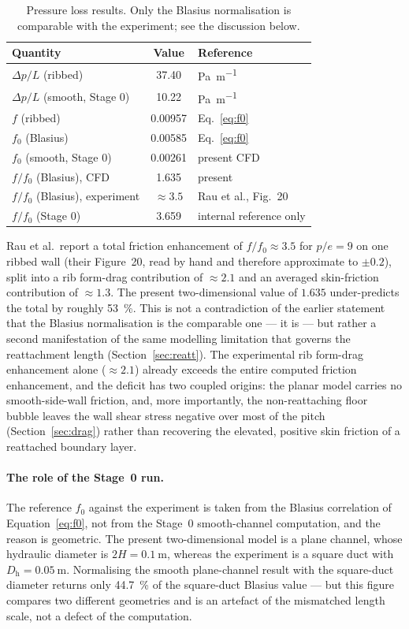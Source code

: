 \documentclass[11pt,a4paper]{article}
\newcommand{\Dh}{D_{\mathrm{h}}}
\begin{document}
\begin{table}[htbp]
\centering
\caption{Pressure loss results. Only the Blasius normalisation is
comparable with the experiment; see the discussion below.}
\label{tab:pressure}
\begin{tabular}{lSl}
\toprule
Quantity & {Value} & Reference \\
\midrule
$\Delta p/L$ (ribbed)   & 37.40   & \si{\pascal\per\meter} \\
$\Delta p/L$ (smooth, Stage 0) & 10.22 & \si{\pascal\per\meter} \\
$f$ (ribbed)            & 0.00957 & Eq.~\eqref{eq:f0} \\
$f_{0}$ (Blasius)       & 0.00585 & Eq.~\eqref{eq:f0} \\
$f_{0}$ (smooth, Stage 0) & 0.00261 & present CFD \\
\midrule
$f/f_{0}$ (Blasius), CFD        & 1.635   & present \\
$f/f_{0}$ (Blasius), experiment & {$\approx 3.5$} & Rau et al., Fig.~20 \\
$f/f_{0}$ (Stage 0)     & 3.659   & internal reference only \\
\bottomrule
\end{tabular}
\end{table}

Rau et al.\ report a total friction enhancement of $f/f_{0} \approx 3.5$ for
$p/e = 9$ on one ribbed wall (their Figure~20, read by hand and therefore
approximate to $\pm 0.2$), split into a rib form-drag contribution of
$\approx 2.1$ and an averaged skin-friction contribution of $\approx 1.3$.
The present two-dimensional value of $1.635$ under-predicts the total by
roughly \SI{53}{\percent}. This is not a contradiction of the earlier
statement that the Blasius normalisation is the comparable one --- it is ---
but rather a second manifestation of the same modelling limitation that
governs the reattachment length (Section~\ref{sec:reatt}). The experimental
rib form-drag enhancement alone ($\approx 2.1$) already exceeds the entire
computed friction enhancement, and the deficit has two coupled origins: the
planar model carries no smooth-side-wall friction, and, more importantly,
the non-reattaching floor bubble leaves the wall shear stress negative over
most of the pitch (Section~\ref{sec:drag}) rather than recovering the
elevated, positive skin friction of a reattached boundary layer.

\paragraph{The role of the Stage~0 run.}
The reference $f_{0}$ against the experiment is taken from the Blasius
correlation of Equation~\eqref{eq:f0}, not from the Stage~0 smooth-channel
computation, and the reason is geometric. The present two-dimensional model
is a plane channel, whose hydraulic diameter is $2H = \SI{0.1}{\meter}$,
whereas the experiment is a square duct with $\Dh = \SI{0.05}{\meter}$.
Normalising the smooth plane-channel result with the square-duct diameter
returns only \SI{44.7}{\percent} of the square-duct Blasius value --- but
this figure compares two different geometries and is an artefact of the
mismatched length scale, not a defect of the computation.
\end{document}
